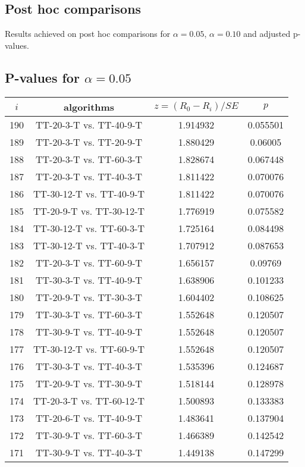 \documentclass[a4paper,10pt]{article}
\begin{document}
\begin{landscape}
\pagebreak

\section{Post hoc comparisons}

Results achieved on post hoc comparisons for $\alpha = 0.05$, $\alpha = 0.10$ and adjusted p-values.

\subsection{P-values for $\alpha=0.05$}

\begin{table}[!htp]
\centering\scriptsize
\begin{tabular}{cccc}
$i$&algorithms&$z=(R_0 - R_i)/SE$&$p$\\
\hline190&TT-20-3-T vs. TT-40-9-T&1.914932&0.055501\\
189&TT-20-3-T vs. TT-20-9-T&1.880429&0.06005\\
188&TT-20-3-T vs. TT-60-3-T&1.828674&0.067448\\
187&TT-20-3-T vs. TT-40-3-T&1.811422&0.070076\\
186&TT-30-12-T vs. TT-40-9-T&1.811422&0.070076\\
185&TT-20-9-T vs. TT-30-12-T&1.776919&0.075582\\
184&TT-30-12-T vs. TT-60-3-T&1.725164&0.084498\\
183&TT-30-12-T vs. TT-40-3-T&1.707912&0.087653\\
182&TT-20-3-T vs. TT-60-9-T&1.656157&0.09769\\
181&TT-30-3-T vs. TT-40-9-T&1.638906&0.101233\\
180&TT-20-9-T vs. TT-30-3-T&1.604402&0.108625\\
179&TT-30-3-T vs. TT-60-3-T&1.552648&0.120507\\
178&TT-30-9-T vs. TT-40-9-T&1.552648&0.120507\\
177&TT-30-12-T vs. TT-60-9-T&1.552648&0.120507\\
176&TT-30-3-T vs. TT-40-3-T&1.535396&0.124687\\
175&TT-20-9-T vs. TT-30-9-T&1.518144&0.128978\\
174&TT-20-3-T vs. TT-60-12-T&1.500893&0.133383\\
173&TT-20-6-T vs. TT-40-9-T&1.483641&0.137904\\
172&TT-30-9-T vs. TT-60-3-T&1.466389&0.142542\\
171&TT-30-9-T vs. TT-40-3-T&1.449138&0.147299\\

\end{tabular}
\end{table}
\end{landscape}
\end{document}
